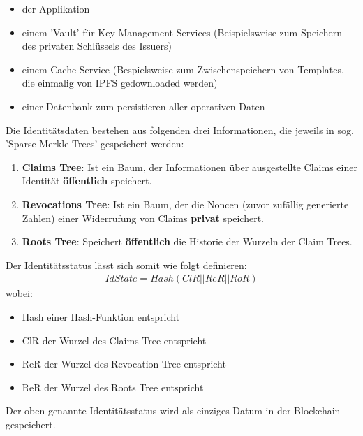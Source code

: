 \begin{itemize}
	\item der Applikation
	\item einem 'Vault' für Key-Management-Services (Beispielsweise zum Speichern des privaten Schlüssels des Issuers)
	\item einem Cache-Service (Bespielsweise zum Zwischenspeichern von Templates, die einmalig von IPFS gedownloaded werden)
	\item einer Datenbank zum persistieren aller operativen Daten
\end{itemize}
\label{merkle}
Die Identitätsdaten bestehen aus folgenden drei Informationen, die jeweils in sog. 'Sparse Merkle Trees' gespeichert werden:
\begin{enumerate}
	\item \textbf{Claims Tree}: Ist ein Baum, der Informationen über ausgestellte Claims einer Identität \textbf{öffentlich} speichert.
	\item \textbf{Revocations Tree}: Ist ein Baum, der die Noncen (zuvor zufällig generierte Zahlen) einer Widerrufung von Claims \textbf{privat} speichert.
	\item \textbf{Roots Tree}: Speichert \textbf{öffentlich} die Historie der Wurzeln der Claim Trees.
\end{enumerate}
Der Identitätsstatus lässt sich somit wie folgt definieren:
\begin{align}
	IdState = Hash(ClR || ReR || RoR)
\end{align}
wobei:
\begin{itemize}
	\item Hash einer Hash-Funktion entspricht
	\item ClR der Wurzel des Claims Tree entspricht
	\item ReR der Wurzel des Revocation Tree entspricht
	\item ReR der Wurzel des Roots Tree entspricht
\end{itemize}
Der oben genannte Identitätsstatus wird als einziges Datum in der Blockchain gespeichert.

